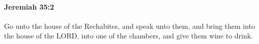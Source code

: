 
		\paragraph{Jeremiah 35:2} %
			\label{JEREMIAH-35-2}

			Go unto the house of the Rechabites, and speak unto them, and bring them into the house of the LORD, into one of the chambers, and give them wine to drink.


